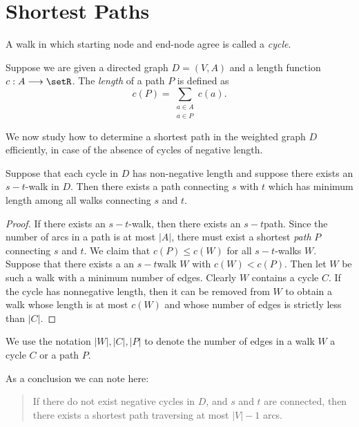 \section{Shortest Paths}
\label{sec:shortest-paths}

\begin{definition}[Cycle]
  A walk in which starting node and end-node agree is called a
  \emph{cycle}. 
\end{definition}

Suppose we are given a directed graph $D=(V,A)$ and a length function
$c:A\longrightarrow\setR$. The \emph{length} of a path $P$ is defined as 
\begin{displaymath}
  c(P) = \sum_{\substack{a \in A\\ a\in P}}  c(a). 
\end{displaymath}

We now study how to determine a shortest path in the weighted graph
$D$ efficiently, in case of the absence of cycles of negative length. 



\begin{theorem}
  \label{thr:1}
  Suppose that each cycle in $D$ has non-negative length and suppose
  there exists an $s-t$-walk in $D$. Then there exists a path
  connecting $s$ with $t$ which has minimum length among all walks
  connecting $s$ and $t$. 
\end{theorem}

\begin{proof}
  If there exists an $s-t$-walk, then there exists an $s-t$path. Since
  the number of arcs in a path is at most $|A|$, there must exist a
  shortest \emph{path}  $P$  connecting $s$ and $t$. We claim that
  $c(P)\leq c(W)$ for all $s-t$-walks $W$. Suppose that there exists a
  an $s-t$walk $W$ with $c(W)<c(P)$. Then let $W$ be such a walk with
  a minimum number of edges. Clearly $W$ contains a cycle $C$.  If the
  cycle has nonnegative length, then it can be removed from $W$ to
  obtain a walk whose length is at most $c(W)$ and whose number of
  edges is strictly less than $|C|$.   
\end{proof}

We use the notation $|W|,|C|,|P|$ to denote the number of edges in a
walk $W$ a cycle $C$ or a path $P$. 



As a conclusion we can note here: 
\begin{quote}
  If there do not exist negative cycles in $D$, and $s$ and $t$ are
  connected, then there exists a shortest path traversing at most 
  $|V|  - 1$ arcs. 
\end{quote}


